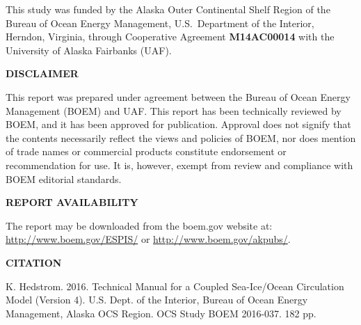 This study was funded by the Alaska Outer Continental Shelf Region
of the Bureau of Ocean Energy Management, U.S.\ Department of the
Interior, Herndon, Virginia, through Cooperative Agreement
{\bf M14AC00014} with the University of Alaska Fairbanks (UAF).


\newpage
\vfil
\centerline{\bf DISCLAIMER}

\vfil
\noindent
This report was prepared under agreement between the Bureau of Ocean
Energy Management (BOEM) and UAF. This report has
been technically reviewed by BOEM, and it has been approved for
publication. Approval does not signify that the contents necessarily
reflect the views and policies of BOEM, nor does mention of trade
names or commercial products constitute endorsement or
recommendation for use. It is, however, exempt from review and
compliance with BOEM editorial standards.

\vfil
\centerline{\bf REPORT AVAILABILITY}
\vfil

\noindent
The report may be downloaded
from the boem.gov website at:
\href{http://www.boem.gov/ESPIS/}{http://www.boem.gov/ESPIS/} or
\href{http://www.boem.gov/akpubs/}{http://www.boem.gov/akpubs/}.

\vfil

\centerline{\bf CITATION}
\vfil

\noindent K. Hedstrom. 2016. Technical Manual for a Coupled Sea-Ice/Ocean
Circulation Model (Version 4).
U.S. Dept. of the Interior, Bureau of Ocean Energy Management,
Alaska OCS Region. OCS Study BOEM 2016-037. 182 pp.


\pagestyle{fancyplain}
\renewcommand{\headrulewidth}{0pt}
\setcounter{page}{1}
\tableofcontents
\newpage
\listoffigures
\listoftables
%





%

%


%
%
\appendix






%



%

\newpage
\pagestyle{empty}

